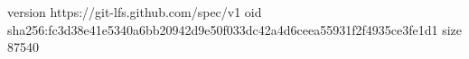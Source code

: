 version https://git-lfs.github.com/spec/v1
oid sha256:fc3d38e41e5340a6bb20942d9e50f033dc42a4d6ceea55931f2f4935ce3fe1d1
size 87540

